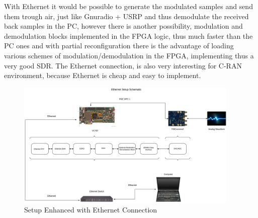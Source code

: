 With Ethernet it would be possible to generate the modulated samples and send
them trough air, just like Gnuradio + USRP and thus demodulate the received back
samples in the PC, however there is another possibility, modulation and
demodulation blocks implemented in the FPGA logic, thus much faster than the PC
ones and with partial reconfiguration there is the advantage of loading various
schemes of modulation/demodulation in the FPGA, implementing thus a very good
SDR. The Ethernet connection, is also very interesting for C-RAN
environment, because Ethernet is cheap and easy to implement.

\begin{figure}[htbp]
    \centering
    \includegraphics[width=0.95\textwidth]{./figures/eth_setup}
    \caption{ Setup Enhanced with Ethernet Connection
    \label{fig:setupeth}}
\end{figure}
